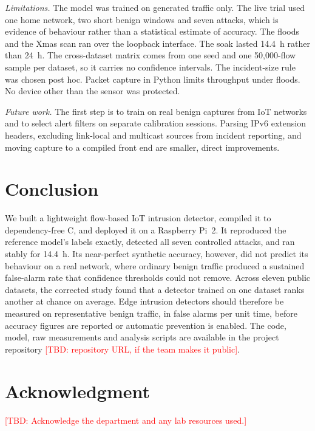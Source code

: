 \documentclass[conference]{IEEEtran}
\newif\iffinal
\newcommand{\TBD}[1]{\iffinal\errmessage{Unresolved TBD: #1}\else
  \textcolor{red}{[TBD: #1]}\fi}
\begin{document}
\textit{Limitations.}
The model was trained on generated traffic only. The live trial used one
home network, two short benign windows and seven attacks, which is
evidence of behaviour rather than a statistical estimate of accuracy. The
floods and the Xmas scan ran over the loopback interface. The soak lasted
14.4~h rather than 24~h. The cross-dataset matrix comes from one seed and
one 50{,}000-flow sample per dataset, so it carries no confidence
intervals. The incident-size rule was chosen post hoc.
Packet capture in Python limits throughput under floods. No device other
than the sensor was protected.

\textit{Future work.}
The first step is to train on real benign captures from IoT networks and to
select alert filters on separate calibration sessions. Parsing IPv6
extension headers, excluding link-local and multicast sources from incident
reporting, and moving capture to a compiled front end are smaller, direct
improvements.

\section{Conclusion}\label{sec:conclusion}

We built a lightweight flow-based IoT intrusion detector, compiled it to
dependency-free C, and deployed it on a Raspberry Pi~2. It reproduced the
reference model's labels exactly, detected all seven controlled attacks,
and ran stably for 14.4~h. Its near-perfect synthetic accuracy, however,
did not predict its behaviour on a real network, where ordinary benign
traffic produced a sustained false-alarm rate that confidence thresholds
could not remove. Across eleven public datasets, the corrected study
found that a detector trained on one dataset ranks another at chance on
average. Edge intrusion detectors should therefore be measured on
representative benign traffic, in false alarms per unit time, before
accuracy figures are reported or automatic prevention is enabled. The code,
model, raw measurements and analysis scripts are available in the
project repository \TBD{repository URL, if the team makes it public}.

\section*{Acknowledgment}
\TBD{Acknowledge the department and any lab resources used.}



\end{document}
